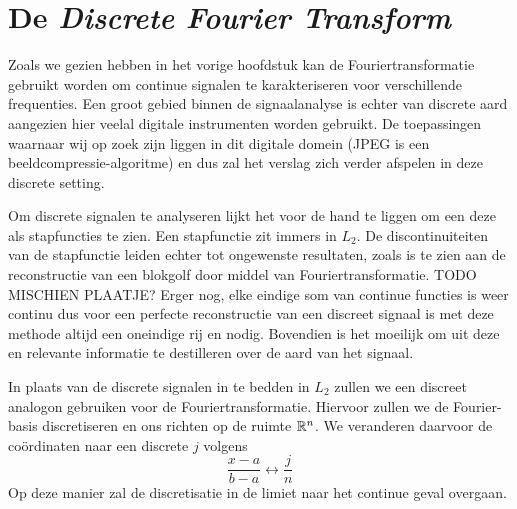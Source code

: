 \section{De \emph{Discrete Fourier Transform}}
Zoals we gezien hebben in het vorige hoofdstuk kan de Fouriertransformatie gebruikt worden om continue signalen te karakteriseren voor verschillende frequenties. Een groot gebied binnen de signaalanalyse is echter van discrete aard aangezien hier veelal digitale instrumenten worden gebruikt. De toepassingen waarnaar wij op zoek zijn liggen in dit digitale domein (JPEG is een beeldcompressie-algoritme) en dus zal het verslag zich verder afspelen in deze discrete setting.

Om discrete signalen te analyseren lijkt het voor de hand te liggen om een deze als stapfuncties te zien. Een stapfunctie zit immers in $L_2$. De discontinuiteiten van de stapfunctie leiden echter tot ongewenste resultaten, zoals is te zien aan de reconstructie van een blokgolf door middel van Fouriertransformatie. TODO MISCHIEN PLAATJE?
Erger nog, elke eindige som van continue functies is weer continu dus voor een perfecte reconstructie van een discreet signaal is met deze methode altijd een oneindige rij \coefficient en nodig. Bovendien is het moeilijk om uit deze \coefficient en relevante informatie te destilleren over de aard van het signaal.

In plaats van de discrete signalen in te bedden in $L_2$ zullen we een discreet analogon gebruiken voor de Fouriertransformatie.
Hiervoor zullen we de Fourier-basis discretiseren en ons richten op de ruimte $\mathbb{R}^n$.
We veranderen daarvoor de co\"ordinaten naar een discrete $j$ volgens
\[
\frac{x-a}{b-a} \leftrightarrow \frac j n 
\]
Op deze manier zal de discretisatie in de limiet naar het continue geval overgaan. 

